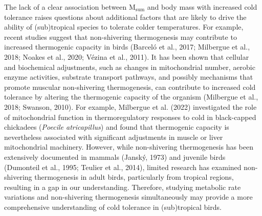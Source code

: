 \documentclass[10pt, twoside]{book} %
\begin{document}
The lack of a clear association between M$_{\text{sum}}$ and body mass with increased cold tolerance raises questions about additional factors that are likely to drive the ability of (sub)tropical species to tolerate colder temperatures. For example, recent studies suggest that non-shivering thermogenesis may contribute to increased thermogenic capacity in birds (Barceló et al., 2017; Milbergue et al., 2018; Noakes et al., 2020; Vézina et al., 2011). It has been shown that cellular and biochemical adjustments, such as changes in mitochondrial number, aerobic enzyme activities, substrate transport pathways, and possibly mechanisms that promote muscular non-shivering thermogenesis, can contribute to increased cold tolerance by altering the thermogenic capacity of the organism (Milbergue et al., 2018; Swanson, 2010). For example, Milbergue et al. (2022) investigated the role of mitochondrial function in thermoregulatory responses to cold in black-capped chickadees (\textit{Poecile atricapillus}) and found that thermogenic capacity is nevertheless associated with significant adjustments in muscle or liver mitochondrial machinery. However, while non-shivering thermogenesis has been extensively documented in mammals (Janský, 1973) and juvenile birds (Dumonteil et al., 1995; Teulier et al., 2014), limited research has examined non-shivering thermogenesis in adult birds, particularly from tropical regions, resulting in a gap in our understanding. Therefore, studying metabolic rate variations and non-shivering thermogenesis simultaneously may provide a more comprehensive understanding of cold tolerance in (sub)tropical birds.\\
\end{document}
